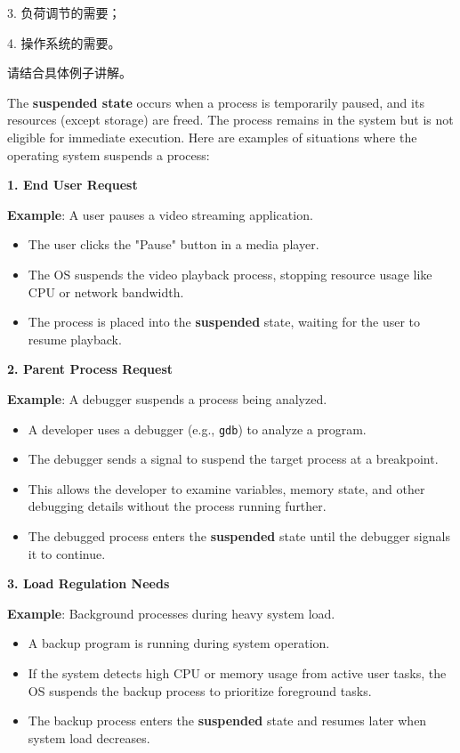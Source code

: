 \documentclass[a4paper]{book}
\begin{document}
3. 负荷调节的需要；

4. 操作系统的需要。

请结合具体例子讲解。


The \textbf{suspended state} occurs when a process is temporarily paused, and its resources (except storage) are freed. The process remains in the system but is not eligible for immediate execution. Here are examples of situations where the operating system suspends a process:

\hrulefill

\textbf{1. End User Request}

\textbf{Example}: A user pauses a video streaming application.
\begin{itemize}
\item 
The user clicks the "Pause" button in a media player.

\item 
The OS suspends the video playback process, stopping resource usage like CPU or network bandwidth.

\item 
The process is placed into the \textbf{suspended} state, waiting for the user to resume playback.

\end{itemize}

\hrulefill

\textbf{2. Parent Process Request}

\textbf{Example}: A debugger suspends a process being analyzed.
\begin{itemize}
\item 
A developer uses a debugger (e.g., \verb|gdb|) to analyze a program.

\item 
The debugger sends a signal to suspend the target process at a breakpoint.

\item 
This allows the developer to examine variables, memory state, and other debugging details without the process running further.

\item 
The debugged process enters the \textbf{suspended} state until the debugger signals it to continue.

\end{itemize}

\hrulefill

\textbf{3. Load Regulation Needs}

\textbf{Example}: Background processes during heavy system load.
\begin{itemize}
\item 
A backup program is running during system operation.

\item 
If the system detects high CPU or memory usage from active user tasks, the OS suspends the backup process to prioritize foreground tasks.

\item 
The backup process enters the \textbf{suspended} state and resumes later when system load decreases.

\end{itemize}
\end{document}
